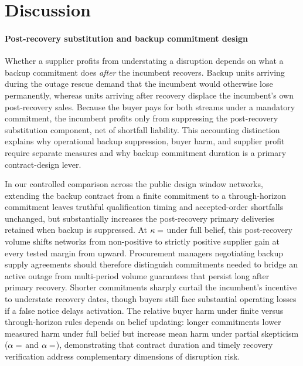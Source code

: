 \documentclass[preprint,11pt,authoryear]{elsarticle}
\begin{document}

\section{Discussion}\label{sec:discussion}
\paragraph{Post-recovery substitution and backup commitment design}
Whether a supplier profits from understating a disruption depends on what a backup commitment does \emph{after} the incumbent recovers. Backup units arriving during the outage rescue demand that the incumbent would otherwise lose permanently, whereas units arriving after recovery displace the incumbent's own post-recovery sales. Because the buyer pays for both streams under a mandatory commitment, the incumbent profits only from suppressing the post-recovery substitution component, net of shortfall liability. This accounting distinction explains why operational backup suppression, buyer harm, and supplier profit require separate measures and why backup commitment duration is a primary contract-design lever.

In our controlled comparison across the  public design window networks, extending the backup contract from a finite commitment to a through-horizon commitment leaves truthful qualification timing and accepted-order shortfalls unchanged, but substantially increases the post-recovery primary deliveries retained when backup is suppressed. At $\kappa=\pc{kappa}$ under full belief, this post-recovery volume shifts  networks from non-positive to strictly positive supplier gain at every tested margin from  upward. Procurement managers negotiating backup supply agreements should therefore distinguish commitments needed to bridge an active outage from multi-period volume guarantees that persist long after primary recovery. Shorter commitments sharply curtail the incumbent's incentive to understate recovery dates, though buyers still face substantial operating losses if a false notice delays activation. The relative buyer harm under finite versus through-horizon rules depends on belief updating: longer commitments lower measured harm under full belief but increase mean harm under partial skepticism ($\alpha=\pc{alpha2}$ and $\alpha=\pc{alpha3}$), demonstrating that contract duration and timely recovery verification address complementary dimensions of disruption risk.
\end{document}
